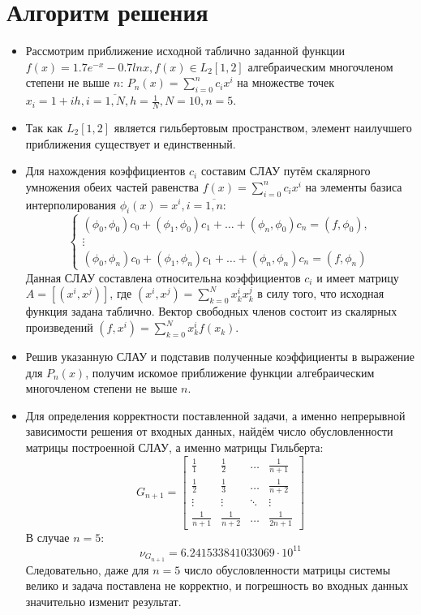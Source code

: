 \documentclass[14pt, a4paper]{article}
\begin{document}
  \section{Алгоритм решения}
  \begin{itemize}
     \item
     Рассмотрим приближение исходной таблично заданной функции $f(x) = 1.7e^{-x} - 0.7lnx, f(x) \in L_2[1, 2]$ алгебраическим многочленом степени не выше $n$: $P_n(x) = \sum\limits_{i = 0}^n c_ix^i$ на множестве точек $x_i = 1 + ih, i = \overline{1, N}, h = \frac{1}{N}, N = 10, n = 5$.
     \item
     Так как $L_2[1, 2]$ является гильбертовым пространством, элемент наилучшего приближения существует и единственный.
     \item
     Для нахождения коэффициентов $c_i$ составим СЛАУ путём скалярного умножения обеих частей равенства $f(x) = \sum\limits_{i = 0}^n c_ix^i$ на элементы базиса интерполирования $\phi_i(x) = x^i, i = \overline{1, n}$:
     \begin{equation}\begin{cases}(\phi_0, \phi_0)c_0 + (\phi_1, \phi_0)c_1 + \dots + (\phi_n, \phi_0)c_n = (f, \phi_0), \\ \vdots \\ (\phi_0, \phi_n)c_0 + (\phi_1, \phi_n)c_1 + \dots + (\phi_n, \phi_n)c_n = (f, \phi_n)\end{cases}\end{equation}
    Данная СЛАУ составлена относительна коэффициентов $c_i$ и имеет матрицу $A = [(x^i, x^j)]$, где $(x^i, x^j) = \sum\limits_{k = 0}^N x_k^ix_k^j$ в силу того, что исходная функция задана таблично. Вектор свободных членов состоит из скалярных произведений $(f, x^i) = \sum\limits_{k = 0}^N x_k^if(x_k)$.
    \item
    Решив указанную СЛАУ и подставив полученные коэффициенты в выражение для $P_n(x)$, получим искомое приближение функции алгебраическим многочленом степени не выше $n$.
    \item
    Для определения корректности поставленной задачи, а именно непрерывной зависимости решения от входных данных, найдём число обусловленности матрицы построенной СЛАУ, а именно матрицы Гильберта:
   \begin{equation}G_{n+1} = \begin{bmatrix}\frac{1}{1} & \frac{1}{2} & \dots & \frac{1}{n+1} \\ \frac{1}{2} & \frac{1}{3} & \dots & \frac{1}{n+2} \\ \vdots & \vdots & \ddots & \vdots \\ \frac{1}{n+1} & \frac{1}{n+2} & \dots & \frac{1}{2n+1}\end{bmatrix}\end{equation}
   В случае $n=5$: \begin{equation}\nu_{G_{n+1}} = 6.241533841033069 \cdot 10^{11}\end{equation}
   Следовательно, даже для $n = 5$ число обусловленности матрицы системы велико и задача поставлена не корректно, и погрешность во входных данных значительно изменит результат.
  \end{itemize}
\end{document}
